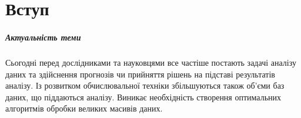 \chapter*{Вступ}

\paragraph{Актуальність теми}

Сьогодні перед дослідниками та науковцями все частіше постають задачі аналізу даних та здійснення прогнозів чи прийняття рішень на підставі результатів аналізу. Із розвитком обчислювальної техніки збільшуються також об'єми баз даних, що піддаються аналізу. Виникає необхідність створення оптимальних алгоритмів обробки великих масивів даних.
